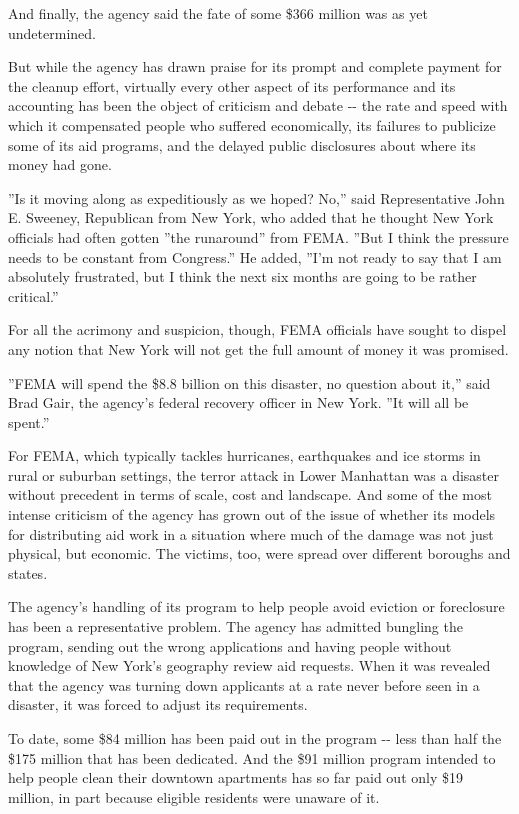 And finally, the agency said the fate of some \$366 million was as yet
undetermined.

But while the agency has drawn praise for its prompt and complete
payment for the cleanup effort, virtually every other aspect of its
performance and its accounting has been the object of criticism and
debate -\/- the rate and speed with which it compensated people who
suffered economically, its failures to publicize some of its aid
programs, and the delayed public disclosures about where its money had
gone.

''Is it moving along as expeditiously as we hoped? No,'' said
Representative John E. Sweeney, Republican from New York, who added that
he thought New York officials had often gotten ''the runaround'' from
FEMA. ''But I think the pressure needs to be constant from Congress.''
He added, ''I'm not ready to say that I am absolutely frustrated, but I
think the next six months are going to be rather critical.''

For all the acrimony and suspicion, though, FEMA officials have sought
to dispel any notion that New York will not get the full amount of money
it was promised.

''FEMA will spend the \$8.8 billion on this disaster, no question about
it,'' said Brad Gair, the agency's federal recovery officer in New York.
''It will all be spent.''

For FEMA, which typically tackles hurricanes, earthquakes and ice storms
in rural or suburban settings, the terror attack in Lower Manhattan was
a disaster without precedent in terms of scale, cost and landscape. And
some of the most intense criticism of the agency has grown out of the
issue of whether its models for distributing aid work in a situation
where much of the damage was not just physical, but economic. The
victims, too, were spread over different boroughs and states.

The agency's handling of its program to help people avoid eviction or
foreclosure has been a representative problem. The agency has admitted
bungling the program, sending out the wrong applications and having
people without knowledge of New York's geography review aid requests.
When it was revealed that the agency was turning down applicants at a
rate never before seen in a disaster, it was forced to adjust its
requirements.

To date, some \$84 million has been paid out in the program -\/- less
than half the \$175 million that has been dedicated. And the \$91
million program intended to help people clean their downtown apartments
has so far paid out only \$19 million, in part because eligible
residents were unaware of it.


